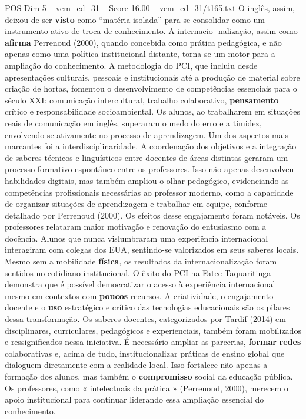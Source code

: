 \begin{textsample}{POS Dim 5 – vem\_ed\_31 – Score 16.00 – vem\_ed\_31/t165.txt}
O inglês, assim, deixou de ser \textbf{visto} como “matéria isolada” para se consolidar como um instrumento ativo de troca de conhecimento.
A internacio- nalização, assim como \textbf{afirma} Perrenoud (2000), quando concebida como prática pedagógica, e não apenas como uma política institucional distante, torna-se um motor para a ampliação do conhecimento.
A metodologia do PCI, que incluiu desde apresentações culturais, pessoais e institucionais até a produção de material sobre criação de hortas, fomentou o desenvolvimento de competências essenciais para o século XXI: comunicação intercultural, trabalho colaborativo, \textbf{pensamento} crítico e responsabilidade socioambiental.
Os alunos, ao trabalharem em situações reais de comunicação em inglês, superaram o medo do erro e a timidez, envolvendo-se ativamente no processo de aprendizagem.
Um dos aspectos mais marcantes foi a interdisciplinaridade.
A coordenação dos objetivos e a integração de saberes técnicos e linguísticos entre docentes de áreas distintas geraram um processo formativo espontâneo entre os professores.
Isso não apenas desenvolveu habilidades digitais, mas também ampliou o olhar pedagógico, evidenciando as competências profissionais necessárias ao professor moderno, como a capacidade de organizar situações de aprendizagem e trabalhar em equipe, conforme detalhado por Perrenoud (2000).
Os efeitos desse engajamento foram notáveis.
Os professores relataram maior motivação e renovação do entusiasmo com a docência.
Alunos que nunca vislumbraram uma experiência internacional interagiram com colegas dos EUA, sentindo-se valorizados em seus saberes locais.
Mesmo sem a mobilidade \textbf{física}, os resultados da internacionalização foram sentidos no cotidiano institucional.
O êxito do PCI na Fatec Taquaritinga demonstra que é possível democratizar o acesso à experiência internacional mesmo em contextos com \textbf{poucos} recursos.
A criatividade, o engajamento docente e o \textbf{uso} estratégico e crítico das tecnologias educacionais são os pilares dessa transformação.
Os saberes docentes, categorizados por Tardif (2014) em disciplinares, curriculares, pedagógicos e experienciais, também foram mobilizados e ressignificados nessa iniciativa.
É necessário ampliar as parcerias, \textbf{formar} \textbf{redes} colaborativas e, acima de tudo, institucionalizar práticas de ensino global que dialoguem diretamente com a realidade local.
Isso fortalece não apenas a formação dos alunos, mas também o \textbf{compromisso} social da educação pública.
Os professores, como « intelectuais da prática » (Perrenoud, 2000), merecem o apoio institucional para continuar liderando essa ampliação essencial do conhecimento.

\end{textsample}
